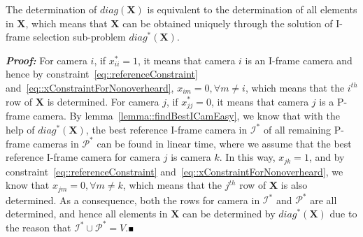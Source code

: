 \begin{mythm}
The determination of $diag(\mathbf{X})$ is equivalent to the determination of all elements in $\mathbf{X}$, which means that $\mathbf{X}$ can be obtained uniquely through the solution of I-frame selection sub-problem $diag^*(\mathbf{X})$.
\label{theorem::determineX}
\end{mythm}
\textbf{\emph{Proof:}}
For camera $i$, if $x_{ii}^* =1$, it means that camera $i$ is an I-frame camera and hence by constraint~\eqref{eq::referenceConstraint} and~\eqref{eq::xConstraintForNonoverheard}, $x_{im}=0, \forall m \neq i$, which means that the $i^{th}$ row of $\mathbf{X}$ is determined.
For camera $j$, if $x_{jj}^* =0$, it means that camera $j$ is a P-frame camera.
By lemma~\ref{lemma::findBestICamEasy}, we know that with the help of $diag^*(\mathbf{X})$, the best reference I-frame camera in $\mathcal{I}^*$ of all remaining P-frame cameras in $\mathcal{P}^*$ can be found in linear time, where we assume that the best reference I-frame camera for camera $j$ is camera $k$.
In this way, $x_{jk}=1$, and by constraint~\eqref{eq::referenceConstraint} and~\eqref{eq::xConstraintForNonoverheard}, we know that $x_{jm}=0, \forall m \neq k$, which means that the $j^{th}$ row of $\mathbf{X}$ is also determined.
As a consequence, both the rows for camera in $\mathcal{I}^*$ and $\mathcal{P}^*$ are all determined, and hence all elements in $\mathbf{X}$ can be determined by $diag^*(\mathbf{X})$ due to the reason that $\mathcal{I}^* \cup \mathcal{P}^* = V$.\hfill$\mathsmaller{\mathsmaller{\blacksquare}}$

